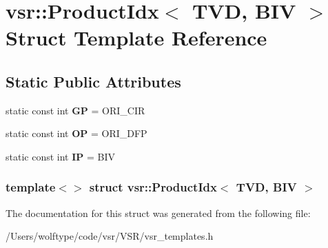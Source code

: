 \hypertarget{structvsr_1_1_product_idx_3_01_t_v_d_00_01_b_i_v_01_4}{\section{vsr\-:\-:Product\-Idx$<$ T\-V\-D, B\-I\-V $>$ Struct Template Reference}
\label{structvsr_1_1_product_idx_3_01_t_v_d_00_01_b_i_v_01_4}
}
\subsection*{Static Public Attributes}
\begin{DoxyCompactItemize}
\item 
\hypertarget{structvsr_1_1_product_idx_3_01_t_v_d_00_01_b_i_v_01_4_ac9b013f4c63a1fd03f86b40a8bce4fa9}{static const int {\bfseries G\-P} = O\-R\-I\-\_\-\-C\-I\-R}\label{structvsr_1_1_product_idx_3_01_t_v_d_00_01_b_i_v_01_4_ac9b013f4c63a1fd03f86b40a8bce4fa9}

\item 
\hypertarget{structvsr_1_1_product_idx_3_01_t_v_d_00_01_b_i_v_01_4_a0285975aa26914612c49ec596303195e}{static const int {\bfseries O\-P} = O\-R\-I\-\_\-\-D\-F\-P}\label{structvsr_1_1_product_idx_3_01_t_v_d_00_01_b_i_v_01_4_a0285975aa26914612c49ec596303195e}

\item 
\hypertarget{structvsr_1_1_product_idx_3_01_t_v_d_00_01_b_i_v_01_4_a3471017eda8fc46ca9468d37962ba0b6}{static const int {\bfseries I\-P} = B\-I\-V}\label{structvsr_1_1_product_idx_3_01_t_v_d_00_01_b_i_v_01_4_a3471017eda8fc46ca9468d37962ba0b6}

\end{DoxyCompactItemize}
\subsubsection*{template$<$$>$ struct vsr\-::\-Product\-Idx$<$ T\-V\-D, B\-I\-V $>$}



The documentation for this struct was generated from the following file\-:\begin{DoxyCompactItemize}
\item 
/\-Users/wolftype/code/vsr/\-V\-S\-R/vsr\-\_\-templates.\-h\end{DoxyCompactItemize}

